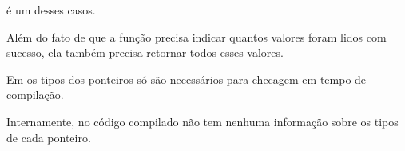  é um desses casos.

Além do fato de que a função precisa indicar quantos valores foram lidos com sucesso, ela também precisa retornar todos esses valores.

Em \CCpp os tipos dos ponteiros só são necessários para checagem em tempo de compilação.

Internamente, no código compilado não tem nenhuma informação sobre os tipos de cada ponteiro.




\ifdefined\IncludeARM

\fi
\ifdefined\IncludeMIPS

\fi
